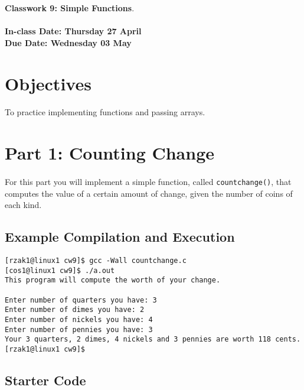 \documentclass[letter,11pt]{article}
\begin{document}
\huge
\textbf{Classwork 9: Simple Functions}.
\normalsize
\\ ~~ \\
\textbf{In-class Date: Thursday 27 April} \\
\textbf{Due Date: Wednesday 03 May}

\section*{Objectives}
\paragraph{}To practice implementing functions and passing arrays.

\section*{Part 1: Counting Change}
\paragraph{}For this part you will implement a simple function, called \texttt{countchange()}, that computes the value of a certain amount of change, given the number of coins of each kind.

\subsection*{Example Compilation and Execution}
\begin{verbatim}
[rzak1@linux1 cw9]$ gcc -Wall countchange.c
[cos1@linux1 cw9]$ ./a.out
This program will compute the worth of your change.

Enter number of quarters you have: 3
Enter number of dimes you have: 2
Enter number of nickels you have: 4
Enter number of pennies you have: 3
Your 3 quarters, 2 dimes, 4 nickels and 3 pennies are worth 118 cents.
[rzak1@linux1 cw9]$ 
\end{verbatim}

\subsection*{Starter Code}
\end{document}
